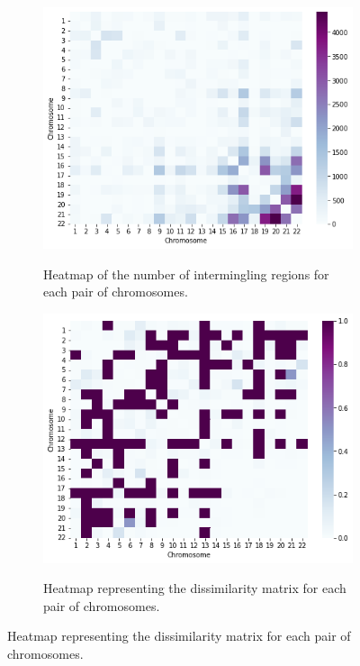 \documentclass[11pt, english, twocolumn]{article}
\begin{document}
\begin{figure}[t]
	\centering
	\begin{subfigure}{0.3\textwidth}
		\includegraphics[width=\textwidth]{counting_regions}\\
		\caption{Heatmap of the number of intermingling regions for each pair of chromosomes.}
		\label{fig:counting-regions}
	\end{subfigure}\hfill
	\begin{subfigure}{0.3\textwidth}
		\includegraphics[width=\textwidth]{dissimilarity_matrix}\\
		\caption{Heatmap representing the dissimilarity matrix for each pair of chromosomes.}

\end{subfigure}
\end{figure}
\end{document}

